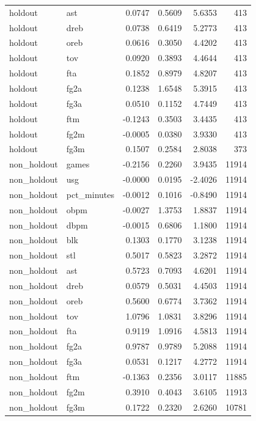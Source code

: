\begin{table}
\begin{tabular}{llrrrr}
holdout & ast & 0.0747 & 0.5609 & 5.6353 & 413 \\
holdout & dreb & 0.0738 & 0.6419 & 5.2773 & 413 \\
holdout & oreb & 0.0616 & 0.3050 & 4.4202 & 413 \\
holdout & tov & 0.0920 & 0.3893 & 4.4644 & 413 \\
holdout & fta & 0.1852 & 0.8979 & 4.8207 & 413 \\
holdout & fg2a & 0.1238 & 1.6548 & 5.3915 & 413 \\
holdout & fg3a & 0.0510 & 0.1152 & 4.7449 & 413 \\
holdout & ftm & -0.1243 & 0.3503 & 3.4435 & 413 \\
holdout & fg2m & -0.0005 & 0.0380 & 3.9330 & 413 \\
holdout & fg3m & 0.1507 & 0.2584 & 2.8038 & 373 \\
non\_holdout & games & -0.2156 & 0.2260 & 3.9435 & 11914 \\
non\_holdout & usg & -0.0000 & 0.0195 & -2.4026 & 11914 \\
non\_holdout & pct\_minutes & -0.0012 & 0.1016 & -0.8490 & 11914 \\
non\_holdout & obpm & -0.0027 & 1.3753 & 1.8837 & 11914 \\
non\_holdout & dbpm & -0.0015 & 0.6806 & 1.1800 & 11914 \\
non\_holdout & blk & 0.1303 & 0.1770 & 3.1238 & 11914 \\
non\_holdout & stl & 0.5017 & 0.5823 & 3.2872 & 11914 \\
non\_holdout & ast & 0.5723 & 0.7093 & 4.6201 & 11914 \\
non\_holdout & dreb & 0.0579 & 0.5031 & 4.4503 & 11914 \\
non\_holdout & oreb & 0.5600 & 0.6774 & 3.7362 & 11914 \\
non\_holdout & tov & 1.0796 & 1.0831 & 3.8296 & 11914 \\
non\_holdout & fta & 0.9119 & 1.0916 & 4.5813 & 11914 \\
non\_holdout & fg2a & 0.9787 & 0.9789 & 5.2088 & 11914 \\
non\_holdout & fg3a & 0.0531 & 0.1217 & 4.2772 & 11914 \\
non\_holdout & ftm & -0.1363 & 0.2356 & 3.0117 & 11885 \\
non\_holdout & fg2m & 0.3910 & 0.4043 & 3.6105 & 11913 \\
non\_holdout & fg3m & 0.1722 & 0.2320 & 2.6260 & 10781 \\
\bottomrule
\end{tabular}
\end{table}
